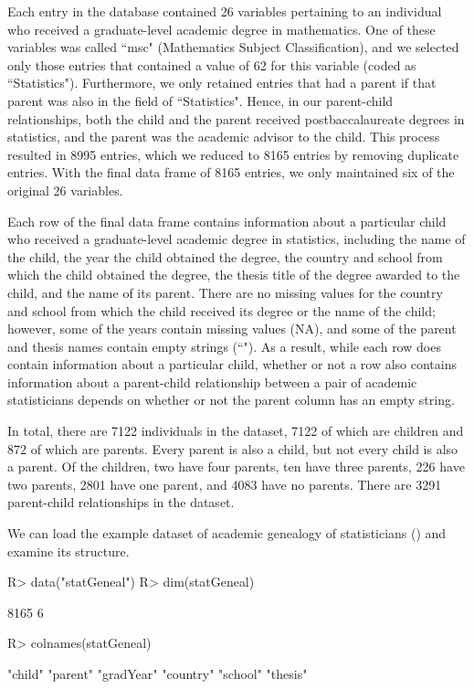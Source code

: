 \documentclass[article,shortnames]{jss}
\begin{document}
Each entry in the database contained 26 variables pertaining to an individual who received a graduate-level academic degree in mathematics. One of these variables was called ``msc" (Mathematics Subject Classification), and we selected only those entries that contained a value of 62 for this variable (coded as ``Statistics"). Furthermore, we only retained entries that had a parent if that parent was also in the field of ``Statistics". Hence, in our parent-child relationships, both the child and the parent received postbaccalaureate degrees in statistics, and the parent was the academic advisor to the child. This process resulted in 8995 entries, which we reduced to 8165 entries by removing duplicate entries. With the final data frame of 8165 entries, we only maintained six of the original 26 variables. 

Each row of the final data frame contains information about a particular child who received a graduate-level academic degree in statistics, including the name of the child, the year the child obtained the degree, the country and school from which the child obtained the degree, the thesis title of the degree awarded to the child, and the name of its parent. There are no missing values for the country and school from which the child received its degree or the name of the child; however, some of the years contain missing values (NA), and some of the parent and thesis names contain empty strings (``"). As a result, while each row does contain information about a particular child, whether or not a row also contains information about a parent-child relationship between a pair of academic statisticians depends on whether or not the parent column has an empty string.
 
In total, there are 7122 individuals in the dataset, 7122 of which are children and 872 of which are parents. Every parent is also a child, but not every child is also a parent. Of the children, two have four parents, ten have three parents, 226 have two parents, 2801 have one parent, and 4083 have no parents. There are 3291 parent-child relationships in the dataset.

We can load the example dataset of academic genealogy of statisticians () and examine its structure. 

\begin{CodeChunk}
\begin{CodeInput}
R> data("statGeneal")
R> dim(statGeneal)
\end{CodeInput}
\begin{CodeOutput}
[1] 8165    6
\end{CodeOutput}
\begin{CodeInput}
R> colnames(statGeneal)
\end{CodeInput}
\begin{CodeOutput}
[1] "child"    "parent"   "gradYear" "country"  "school"   "thesis" 
\end{CodeOutput}
\end{CodeChunk}
\end{document}
